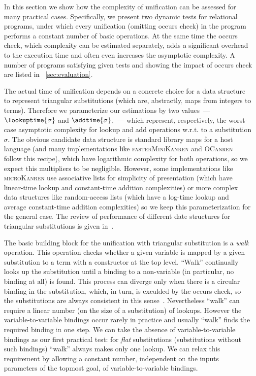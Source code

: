 In this section we show how the complexity of unification can be assessed for many practical cases. Specifically, we present two dynamic tests
for relational programs, under which every unification (omitting occurs check) in the program performs a constant number of basic operations. At the same
time the occurs check, which complexity can be estimated separately, adds a significant overhead to the execution time and often even increases the asymptotic complexity.
A number of programs satisfying given tests and showing the impact of occurs check are listed in \sectionword~\ref{sec:evaluation}.

The actual time of unification depends on a concrete choice for a data structure to represent triangular substitutions (which are, abstractly, maps from integers to terms).
Therefore we parameterize our estimations by two values~--- $\lookuptime{\sigma}$ and $\addtime{\sigma}$,~--- which represent, respectively, the
worst-case asymptotic complexity for lookup and add operations w.r.t. to a substitution $\sigma$. The obvious candidate data structure is standard library maps
for a host language (and many implementations like \textsc{fasterMiniKanren} and \textsc{OCanren} follow this recipe), which have logarithmic complexity for both operations,
so we expect this multipliers to be negligible. However, some implementations like \textsc{microKanren} use associative lists for simplicity of presentation (which have linear-time
lookup and constant-time addition complexities) or more complex data structures like random-access lists (which have a log-time lookup and average constant-time addition complexities)
so we keep this parameterization for the general case. The review of performance of different date structures for triangular substitutions is given in~\cite{SubstDataStructs}.

The basic building block for the unification with triangular substitution is a \emph{walk} operation. This operation checks whether a given variable is mapped by a given substitution to a
term with a constructor at the top level. ``Walk'' continually looks up the substitution until a binding to a non-variable (in particular, no binding at all) is found. This
process can diverge only when there is a circular binding in the substitution, which, in turn, is exculded by the occurs check, so the substitutions are always consistent
in this sense~\cite{NominalUnificationWithTriangularSubstitutions}. Nevertheless ``walk'' can require a linear number (on the size of a substitution) of lookups.
However the variable-to-variable bindings occur rarely in practice and usually ``walk'' finds the required binding in one step. We can take the absence of variable-to-variable bindings
as our first practical test: for \emph{flat} substitutions (substitutions without such bindings) ``walk'' always makes only one lookup. We can relax this requirement by allowing a
constant number, independent on the inputs parameters of the topmost goal, of variable-to-variable bindings.

